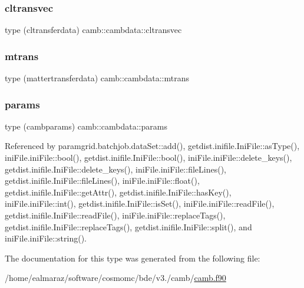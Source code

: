 \mbox{\label{structcamb_1_1cambdata_a52fab84f366067092bb6d96934a599dd}} 
\subsubsection{\texorpdfstring{cltransvec}{cltransvec}}
{\footnotesize\ttfamily type (cltransferdata) camb\+::cambdata\+::cltransvec}

\mbox{\label{structcamb_1_1cambdata_a5c1bba217f24f554c27ad2300f5c4c63}} 
\subsubsection{\texorpdfstring{mtrans}{mtrans}}
{\footnotesize\ttfamily type (mattertransferdata) camb\+::cambdata\+::mtrans}

\mbox{\label{structcamb_1_1cambdata_ad6a0cc3fa15eae90c1762ea681d1112f}} 
\subsubsection{\texorpdfstring{params}{params}}
{\footnotesize\ttfamily type (cambparams) camb\+::cambdata\+::params}



Referenced by paramgrid.\+batchjob.\+data\+Set\+::add(), getdist.\+inifile.\+Ini\+File\+::as\+Type(), ini\+File.\+ini\+File\+::bool(), getdist.\+inifile.\+Ini\+File\+::bool(), ini\+File.\+ini\+File\+::delete\+\_\+keys(), getdist.\+inifile.\+Ini\+File\+::delete\+\_\+keys(), ini\+File.\+ini\+File\+::file\+Lines(), getdist.\+inifile.\+Ini\+File\+::file\+Lines(), ini\+File.\+ini\+File\+::float(), getdist.\+inifile.\+Ini\+File\+::get\+Attr(), getdist.\+inifile.\+Ini\+File\+::has\+Key(), ini\+File.\+ini\+File\+::int(), getdist.\+inifile.\+Ini\+File\+::is\+Set(), ini\+File.\+ini\+File\+::read\+File(), getdist.\+inifile.\+Ini\+File\+::read\+File(), ini\+File.\+ini\+File\+::replace\+Tags(), getdist.\+inifile.\+Ini\+File\+::replace\+Tags(), getdist.\+inifile.\+Ini\+File\+::split(), and ini\+File.\+ini\+File\+::string().



The documentation for this type was generated from the following file\+:\begin{DoxyCompactItemize}
\item 
/home/ealmaraz/software/cosmomc/bde/v3./camb/\mbox{\hyperlink{camb_8f90}{camb.\+f90}}\end{DoxyCompactItemize}
